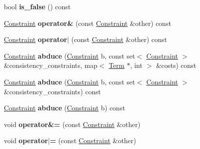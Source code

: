 \begin{DoxyCompactItemize}
\item 
\hypertarget{classConstraint_adcd1a02849bd76c4aa40db13f24392a2}{bool {\bfseries is\-\_\-false} () const }\label{classConstraint_adcd1a02849bd76c4aa40db13f24392a2}

\item 
\hypertarget{classConstraint_a2a33670d51bf67ee84b788d51b68d4e5}{\hyperlink{classConstraint}{\-Constraint} {\bfseries operator\&} (const \hyperlink{classConstraint}{\-Constraint} \&other) const }\label{classConstraint_a2a33670d51bf67ee84b788d51b68d4e5}

\item 
\hypertarget{classConstraint_af5fc887697ec9958f0146c5c3d2dde3b}{\hyperlink{classConstraint}{\-Constraint} {\bfseries operator$|$} (const \hyperlink{classConstraint}{\-Constraint} \&other) const }\label{classConstraint_af5fc887697ec9958f0146c5c3d2dde3b}

\item 
\hypertarget{classConstraint_a7bb776021ac3f71c5d3fd2aaae573e50}{\hyperlink{classConstraint}{\-Constraint} {\bfseries abduce} (\hyperlink{classConstraint}{\-Constraint} b, const set$<$ \hyperlink{classConstraint}{\-Constraint} $>$ \&consistency\-\_\-constraints, map$<$ \hyperlink{classTerm}{\-Term} $\ast$, int $>$ \&costs) const }\label{classConstraint_a7bb776021ac3f71c5d3fd2aaae573e50}

\item 
\hypertarget{classConstraint_a0046df78524656d44014a637609867e5}{\hyperlink{classConstraint}{\-Constraint} {\bfseries abduce} (\hyperlink{classConstraint}{\-Constraint} b, const set$<$ \hyperlink{classConstraint}{\-Constraint} $>$ \&consistency\-\_\-constraints) const }\label{classConstraint_a0046df78524656d44014a637609867e5}

\item 
\hypertarget{classConstraint_a8e687501d399750ee3ede57853981128}{\hyperlink{classConstraint}{\-Constraint} {\bfseries abduce} (\hyperlink{classConstraint}{\-Constraint} b) const }\label{classConstraint_a8e687501d399750ee3ede57853981128}

\item 
\hypertarget{classConstraint_a31845ae694933cdb1df102b03ca15792}{void {\bfseries operator\&=} (const \hyperlink{classConstraint}{\-Constraint} \&other)}\label{classConstraint_a31845ae694933cdb1df102b03ca15792}

\item 
\hypertarget{classConstraint_abc1dedce9d25e37579700fd7a0756640}{void {\bfseries operator$|$=} (const \hyperlink{classConstraint}{\-Constraint} \&other)}\label{classConstraint_abc1dedce9d25e37579700fd7a0756640}


\end{DoxyCompactItemize}
